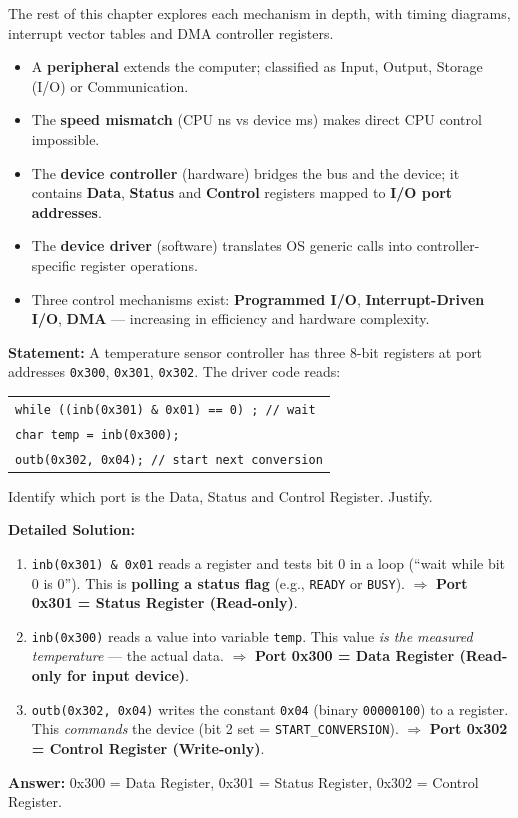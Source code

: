 \documentclass[11pt]{article}
\begin{document}
The rest of this chapter explores each mechanism in depth, with timing diagrams, interrupt vector tables and DMA controller registers.

\begin{aretenir}
\begin{itemize}
\item A \textbf{peripheral} extends the computer; classified as Input, Output, Storage (I/O) or Communication.
\item The \textbf{speed mismatch} (CPU ns vs device ms) makes direct CPU control impossible.
\item The \textbf{device controller} (hardware) bridges the bus and the device; it contains \textbf{Data}, \textbf{Status} and \textbf{Control} registers mapped to \textbf{I/O port addresses}.
\item The \textbf{device driver} (software) translates OS generic calls into controller-specific register operations.
\item Three control mechanisms exist: \textbf{Programmed I/O}, \textbf{Interrupt-Driven I/O}, \textbf{DMA} — increasing in efficiency and hardware complexity.
\end{itemize}
\end{aretenir}

\begin{exoresolu}
\textbf{Statement:} A temperature sensor controller has three 8-bit registers at port addresses \texttt{0x300}, \texttt{0x301}, \texttt{0x302}. The driver code reads:
\begin{center}
\begin{tabular}{l}
\texttt{while ((inb(0x301) \& 0x01) == 0) ; // wait}\\
\texttt{char temp = inb(0x300);}\\
\texttt{outb(0x302, 0x04); // start next conversion}
\end{tabular}
\end{center}
Identify which port is the Data, Status and Control Register. Justify.

\tcblower
\textbf{Detailed Solution:}
\begin{enumerate}
    \item \texttt{inb(0x301) \& 0x01} reads a register and tests bit 0 in a loop (``wait while bit 0 is 0''). This is \textbf{polling a status flag} (e.g., \texttt{READY} or \texttt{BUSY}). $\Rightarrow$ \textbf{Port 0x301 = Status Register (Read-only)}.
    \item \texttt{inb(0x300)} reads a value into variable \texttt{temp}. This value \emph{is the measured temperature} --- the actual data. $\Rightarrow$ \textbf{Port 0x300 = Data Register (Read-only for input device)}.
    \item \texttt{outb(0x302, 0x04)} writes the constant \texttt{0x04} (binary \texttt{00000100}) to a register. This \emph{commands} the device (bit 2 set = \texttt{START\_CONVERSION}). $\Rightarrow$ \textbf{Port 0x302 = Control Register (Write-only)}.
\end{enumerate}
\textbf{Answer:} 0x300 = Data Register, 0x301 = Status Register, 0x302 = Control Register.
\end{exoresolu}
\end{document}

